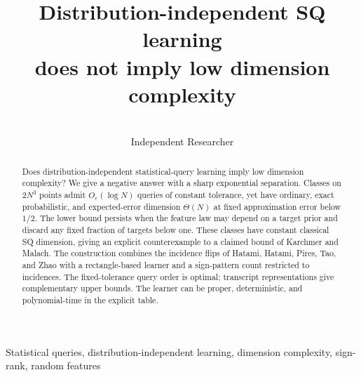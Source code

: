 \documentclass[11pt,letterpaper,pmlr,twoside]{jmlr}
\title[SQ learning and dimension complexity]{Distribution-independent SQ learning\\does not imply low dimension complexity}
\author[Anonymous]{\Name{Anonymous Author}}
\author[Mausberg]{\Name{Samuel Mausberg}\\\addr Independent Researcher}
\newcommand{\eps}{\varepsilon}
\begin{document}
\maketitle
\begin{abstract}
Does distribution-independent statistical-query learning imply low dimension complexity? We give a negative answer with a sharp exponential separation. Classes on $2N^3$ points admit $O_\eps(\log N)$ queries of constant tolerance, yet have ordinary, exact probabilistic, and expected-error dimension $\Theta(N)$ at fixed approximation error below $1/2$. The lower bound persists when the feature law may depend on a target prior and discard any fixed fraction of targets below one. These classes have constant classical SQ dimension, giving an explicit counterexample to a claimed bound of Karchmer and Malach. The construction combines the incidence flips of Hatami, Hatami, Pires, Tao, and Zhao with a rectangle-based learner and a sign-pattern count restricted to incidences. The fixed-tolerance query order is optimal; transcript representations give complementary upper bounds. The learner can be proper, deterministic, and polynomial-time in the explicit table.
\end{abstract}
\begin{keywords}
Statistical queries, distribution-independent learning, dimension complexity, sign-rank, random features
\end{keywords}


\clearpage
\appendix

\end{document}
